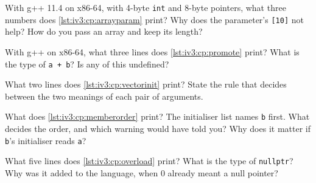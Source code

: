 \begin{question}\label{iq:iv3:cpp:5}
With g++ 11.4 on x86-64, with 4-byte \texttt{int} and 8-byte pointers, what three numbers does \cref{lst:iv3:cp:arrayparam} print? Why does the parameter's \texttt{[10]} not help? How do you pass an array and keep its length?
\label{lst:iv3:cp:arrayparam}
\end{question}

\begin{question}\label{iq:iv3:cpp:6}
With g++ on x86-64, what three lines does \cref{lst:iv3:cp:promote} print? What is the type of \texttt{a + b}? Is any of this undefined?
\label{lst:iv3:cp:promote}
\end{question}

\begin{question}\label{iq:iv3:cpp:7}
What two lines does \cref{lst:iv3:cp:vectorinit} print? State the rule that decides between the two meanings of each pair of arguments.
\label{lst:iv3:cp:vectorinit}
\end{question}

\begin{question}\label{iq:iv3:cpp:8}
What does \cref{lst:iv3:cp:memberorder} print? The initialiser list names \texttt{b} first. What decides the order, and which warning would have told you? Why does it matter if \texttt{b}'s initialiser reads \texttt{a}?
\label{lst:iv3:cp:memberorder}
\end{question}

\begin{question}\label{iq:iv3:cpp:9}
What five lines does \cref{lst:iv3:cp:overload} print? What is the type of \texttt{nullptr}? Why was it added to the language, when 0 already meant a null pointer?
\label{lst:iv3:cp:overload}
\end{question}

